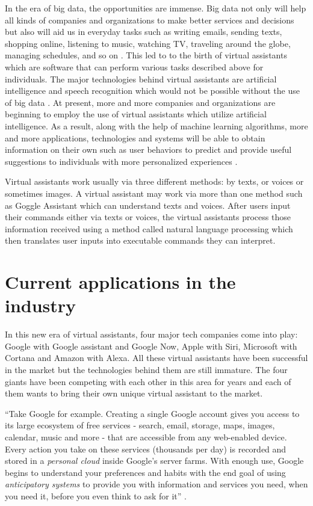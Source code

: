 In the era of big data, the opportunities are immense. Big data not only will help all kinds of companies and organizations to make better services and decisions but also will aid us in everyday tasks such as writing emails, sending texts, shopping online, listening to music, watching TV, traveling around the globe, managing schedules, and so on \cite{Tal2015internet}. This led to to the birth of virtual assistants which are software that can perform various tasks described above for individuals. The major technologies behind virtual assistants are artificial intelligence and speech recognition which would not be possible without the use of big data \cite{Baron2017assistants}. At present, more and more companies and organizations are beginning to employ the use of virtual assistants which utilize artificial intelligence. As a result, along with the help of machine learning algorithms, more and more applications, technologies and systems will be able to obtain information on their own such as user behaviors to predict and provide useful suggestions to individuals with more personalized experiences \cite{Hard2014applications}.

Virtual assistants work usually via three different methods: by texts, or voices or sometimes images. A virtual assistant may work via more than one method such as Goggle Assistant which can understand texts and voices. After users input their commands either via texts or voices, the virtual assistants process those information received using a method called natural language processing which then translates user inputs into executable commands they can interpret. 

\section{Current applications in the industry}

In this new era of virtual assistants, four major tech companies come into play: Google with Google assistant and Google Now, Apple with Siri, Microsoft with Cortana and Amazon with Alexa. All these virtual assistants have been successful in the market but the technologies behind them are still immature. The four giants have been competing with each other in this area for years and each of them wants to bring their own unique virtual assistant to the market. 



``Take Google for example. Creating a single Google account gives you access to its large ecosystem of free services - search, email, storage, maps, images, calendar, music and more - that are accessible from any web-enabled device. Every action you take on these services (thousands per day) is recorded and stored in a {\em personal cloud} inside Google's server farms. With enough use, Google begins to understand your preferences and habits with the end goal of using {\em anticipatory systems} to provide you with information and services you need, when you need it, before you even think to ask for it'' \cite{Tal2015internet}.

